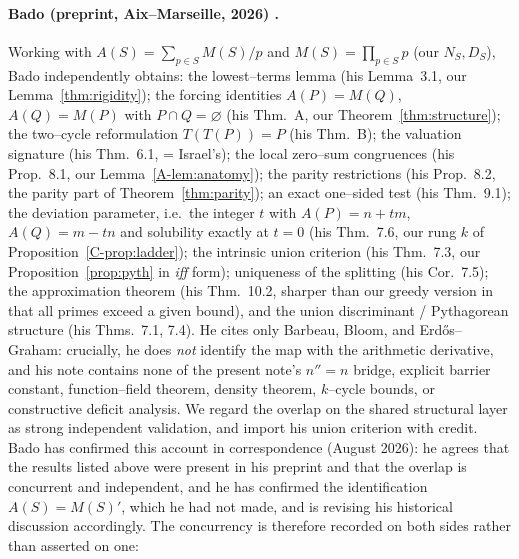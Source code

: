 \documentclass[11pt]{article}
\theoremstyle{definition}
\begin{document}
\paragraph{Bado (preprint, Aix--Marseille, 2026) \cite{Bado2026}.}
Working with $A(S)=\sum_{p\in S}M(S)/p$ and $M(S)=\prod_{p\in S}p$ (our $N_S,D_S$), Bado independently
obtains: the lowest--terms lemma (his Lemma~3.1, our Lemma~\ref{thm:rigidity}); the forcing identities
$A(P)=M(Q)$, $A(Q)=M(P)$ with $P\cap Q=\varnothing$ (his Thm.~A, our Theorem~\ref{thm:structure}); the
two--cycle reformulation $T(T(P))=P$ (his Thm.~B); the valuation signature (his Thm.~6.1, = Israel's);
the local zero--sum congruences (his Prop.~8.1, our Lemma~\ref{A-lem:anatomy}); the parity restrictions
(his Prop.~8.2, the parity part of Theorem~\ref{thm:parity}); an exact one--sided test (his Thm.~9.1); the deviation parameter, i.e.\ the integer $t$ with
$A(P)=n+tm$, $A(Q)=m-tn$ and solubility exactly at $t=0$ (his Thm.~7.6, our rung $k$ of
Proposition~\ref{C-prop:ladder}); the intrinsic union criterion (his Thm.~7.3, our
Proposition~\ref{prop:pyth} in \emph{iff} form); uniqueness of the splitting (his Cor.~7.5);
the approximation theorem (his Thm.~10.2, sharper than our greedy version in that all primes exceed a
given bound), and the union discriminant / Pythagorean structure (his Thms.~7.1, 7.4). He cites only
Barbeau, Bloom, and Erd\H{o}s--Graham: crucially, he does \emph{not} identify the map with the
arithmetic derivative, and his note contains none of the present note's $n''=n$ bridge, explicit
barrier constant, function--field theorem, density theorem, $k$--cycle bounds, or constructive
deficit analysis. We regard the overlap on the shared structural layer as strong independent
validation, and import his union criterion with credit. Bado has confirmed this account in
correspondence (August 2026): he agrees that the results listed above were present in his
preprint and that the overlap is concurrent and independent, and he has confirmed the
identification $A(S)=M(S)'$, which he had not made, and is revising his historical discussion
accordingly. The concurrency is therefore recorded on both sides rather than asserted on one:
\end{document}
